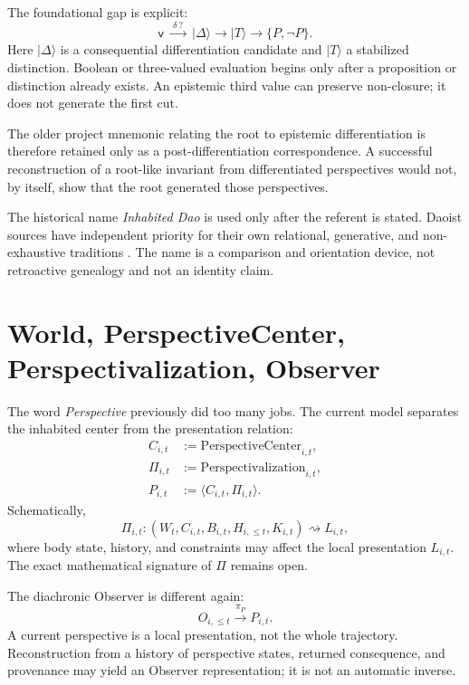 \documentclass[11pt]{article}
\newcommand{\VR}{\mathsf{v}}
\begin{document}
The foundational gap is explicit:
\begin{equation}
\VR\;\xrightarrow{\ \delta\ ?\ }\;|\Delta\rangle
\rightarrow |T\rangle
\rightarrow\{P,\neg P\}.
\end{equation}
Here $|\Delta\rangle$ is a consequential differentiation candidate and $|T\rangle$ a stabilized distinction. Boolean or three-valued evaluation begins only after a proposition or distinction already exists. An epistemic third value can preserve non-closure; it does not generate the first cut.

The older project mnemonic relating the root to epistemic differentiation is therefore retained only as a post-differentiation correspondence. A successful reconstruction of a root-like invariant from differentiated perspectives would not, by itself, show that the root generated those perspectives.

The historical name \emph{Inhabited Dao} is used only after the referent is stated. Daoist sources have independent priority for their own relational, generative, and non-exhaustive traditions \cite{SEPChineseMetaphysics2023,Wang2013Yinyang,Hansen2025Daoism}. The name is a comparison and orientation device, not retroactive genealogy and not an identity claim.

\section{World, PerspectiveCenter, Perspectivalization, Observer}

The word \emph{Perspective} previously did too many jobs. The current model separates the inhabited center from the presentation relation:
\begin{align}
C_{i,t} &:= \mathrm{PerspectiveCenter}_{i,t},\\
\Pi_{i,t} &:= \mathrm{Perspectivalization}_{i,t},\\
P_{i,t} &:= \langle C_{i,t},\Pi_{i,t}\rangle.
\end{align}
Schematically,
\begin{equation}
\Pi_{i,t}:(W_t,C_{i,t},B_{i,t},H_{i,\le t},K_{i,t})\rightsquigarrow L_{i,t},
\end{equation}
where body state, history, and constraints may affect the local presentation $L_{i,t}$. The exact mathematical signature of $\Pi$ remains open.

The diachronic Observer is different again:
\begin{equation}
O_{i,\le t}\xrightarrow{\pi_P}P_{i,t}.
\end{equation}
A current perspective is a local presentation, not the whole trajectory. Reconstruction from a history of perspective states, returned consequence, and provenance may yield an Observer representation; it is not an automatic inverse.
\end{document}
